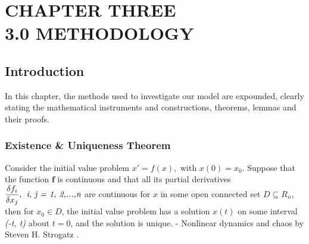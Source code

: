 
\chapter{CHAPTER THREE\\3.0 METHODOLOGY} %

\label{Chapter3} %


\section{Introduction}
In this chapter, the methods used to investigate our model are expounded, clearly stating the mathematical instruments and constructions, theorems, lemmas and their proofs. 
\subsection{Existence \& Uniqueness Theorem}
\begin{theorem}
	Consider the initial value problem
	$x' = f(x),$  with $x(0) = x_{0}$.
	Suppose that the function $ \textbf{f} $ is continuous and that all its partial derivatives 
	$\dfrac{\delta f_{i}}{\delta x_{j}},\medspace\medspace \emph{i, j = 1, 2,...,n}$ are continuous for $x$ in some open connected set $D\subseteq R_{n}$, then for $x_{0}\in D$, the initial value problem has a solution $x(t)$ on some interval \emph{(-t, t)} about $t = 0$, and the solution is unique. - Nonlinear dynamics and chaos by Steven H. Strogatz \parencite{strogatz2018nonlinear}.
\end{theorem}

